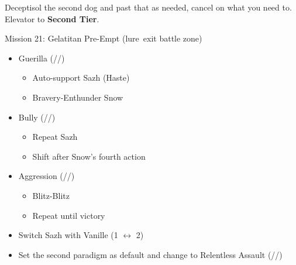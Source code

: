 \renewcommand{\first}{[1] Guerilla (\syn/\sab/\rav)}
\renewcommand{\second}{[2] Devastation (\com/\sab/\com)}
\renewcommand{\third}{[3] Hero's Charge (\syn/\med/\com)}
\renewcommand{\fourth}{[4] Tireless Charge (\com/\med/\com)}
\renewcommand{\fifth}{[5] Bully (\syn/\sab/\com)}
\renewcommand{\sixth}{[6] Aggression (\com/\rav/\com)}
\begin{multicols}{2}

  Deceptisol the second dog and past that as needed, cancel on what you need to.
  Elevator to \textbf{Second Tier}.
  \begin{battle}{Mission 21: Gelatitan Pre-Empt (lure\, exit battle zone)}
    \begin{itemize}
      \item \first
            \begin{itemize}
              \item Auto-support Sazh (Haste)
              \item Bravery-Enthunder Snow
            \end{itemize}
      \item \fifth
            \begin{itemize}
              \item Repeat Sazh
              \item Shift after Snow's fourth action
            \end{itemize}
      \item \sixth
            \begin{itemize}
              \item Blitz-Blitz
              \item Repeat until victory
            \end{itemize}
    \end{itemize}
  \end{battle}
  \begin{menu}
    \begin{itemize}
      \paradigm
      \begin{itemize}
        \item Switch Sazh with Vanille (1 $\leftrightarrow$ 2)
        \item Set the second paradigm as default and change to Relentless Assault (\rav/\com/\rav)
      \end{itemize}
    \end{itemize}
  \end{menu}
  \renewcommand{\second}{[2]Relentless Assault (\rav/\com/\rav)}

\end{multicols}
